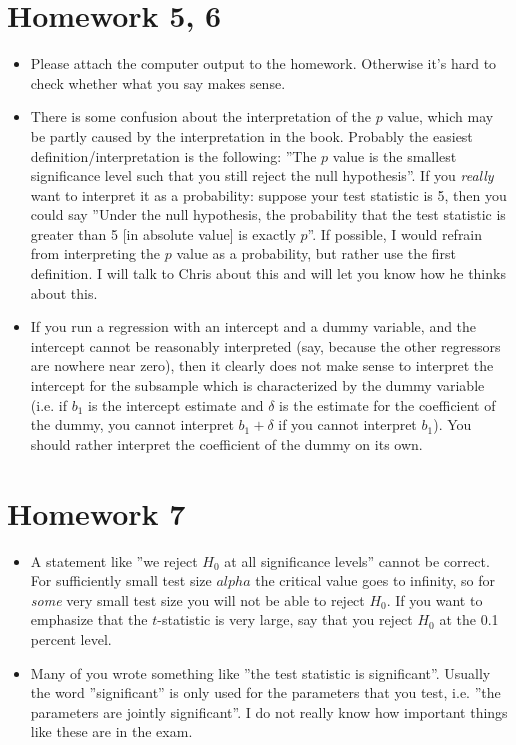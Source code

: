 \documentclass{article}
\begin{document}
\section{Homework 5, 6}
\begin{itemize}
\item Please attach the computer output to the homework. Otherwise it's hard to check whether what you say makes sense.
\item There is some confusion about the interpretation of the $p$ value, which may be partly caused by the interpretation in the book. Probably the easiest definition/interpretation is the following: ''The $p$ value is the smallest significance level such that you still reject the null hypothesis''. If you \emph{really} want to interpret it as a probability: suppose your test statistic is 5, then you could say ''Under the null hypothesis, the probability that the test statistic is greater than 5 [in absolute value] is exactly $p$''. If possible, I would refrain from interpreting the $p$ value as a probability, but rather use the first definition. I will talk to Chris about this and will let you know how he thinks about this.
\item If you run a regression with an intercept and a dummy variable, and the intercept cannot be reasonably interpreted (say, because the other regressors are nowhere near zero), then it clearly does not make sense to interpret the intercept for the subsample which is characterized by the dummy variable (i.e. if $b_1$ is the intercept estimate and $\delta$ is the estimate for the coefficient of the dummy, you cannot interpret $b_1+\delta$ if you cannot interpret $b_1$). You should rather interpret the coefficient of the dummy on its own.
\end{itemize}

\section{Homework 7}
\begin{itemize}
\item A statement like ''we reject $H_0$ at all significance levels'' cannot be correct. For sufficiently small test size $alpha$ the critical value goes to infinity, so for \emph{some} very small test size you will not be able to reject $H_0$. If you want to emphasize that the $t$-statistic is very large, say that you reject $H_0$ at the 0.1 percent level.
\item Many of you wrote something like ''the test statistic is significant''. Usually the word ''significant'' is only used for the parameters that you test, i.e. ''the parameters are jointly significant''. I do not really know how important things like these are in the exam.

\end{itemize}
\end{document}
